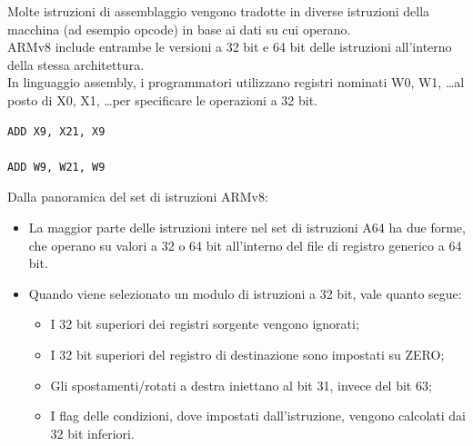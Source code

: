 \documentclass[12pt,a4paper]{article}
\begin{document}
Molte istruzioni di assemblaggio vengono tradotte in diverse istruzioni della macchina (ad esempio opcode) in base ai dati su cui operano.\\
ARMv8 include entrambe le versioni a 32 bit e 64 bit delle istruzioni all'interno della stessa architettura.\\
In linguaggio assembly, i programmatori utilizzano registri nominati W0, W1, \dots al posto di X0, X1, \dots per specificare le operazioni a 32 bit.
\begin{center}
\begin{minipage}{.2\textwidth}
\begin{verbatim}
ADD X9, X21, X9

ADD W9, W21, W9
\end{verbatim}
\end{minipage}
\end{center}
Dalla panoramica del set di istruzioni ARMv8:
\begin{itemize}
\item La maggior parte delle istruzioni intere nel set di istruzioni A64 ha due forme, che operano su valori a 32 o 64 bit all'interno del file di registro generico a 64 bit.
\item Quando viene selezionato un modulo di istruzioni a 32 bit, vale quanto segue:
\begin{itemize}
\item I 32 bit superiori dei registri sorgente vengono ignorati;
\item I 32 bit superiori del registro di destinazione sono impostati su ZERO;
\item Gli spostamenti/rotati a destra iniettano al bit 31, invece del bit 63;
\item I flag delle condizioni, dove impostati dall'istruzione, vengono calcolati dai 32 bit inferiori.
\end{itemize}
\end{itemize}
\end{document}
